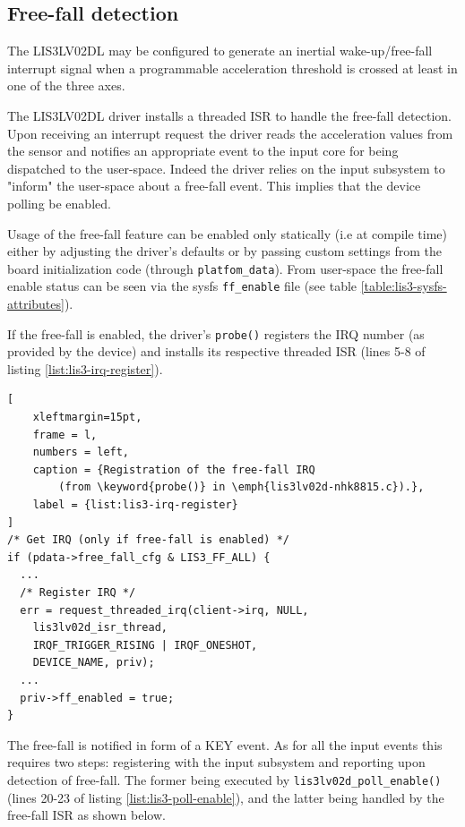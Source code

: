 \documentclass[a4paper,10pt]{article}
\newcommand{\keyword}[1]{\texttt{#1}}
\begin{document}
\begin{multicols}{2}
\subsection{Free-fall detection}
\label{sec:lis3_free-fall}
The LIS3LV02DL may be configured to generate an inertial wake-up/free-fall
interrupt signal when a programmable acceleration threshold is crossed at least
in one of the three axes.

The LIS3LV02DL driver installs a threaded ISR to handle the free-fall detection.
Upon receiving an interrupt request the driver reads the acceleration values
from the sensor and notifies an appropriate event to the input core for being
dispatched to the user-space.
Indeed the driver relies on the input subsystem to "inform" the user-space
about a free-fall event. This implies that the device polling be enabled.

Usage of the free-fall feature can be enabled only statically (i.e at compile
time) either by adjusting the driver's defaults or by passing custom settings
from the board initialization code (through \keyword{platfom\_data}).
From user-space the free-fall enable status can be seen via the sysfs
\keyword{ff\_enable} file (see table \ref{table:lis3-sysfs-attributes}).

If the free-fall is enabled, the driver's \keyword{probe()} registers the IRQ
number (as provided by the device) and installs its respective threaded ISR
(lines 5-8 of listing \ref{list:lis3-irq-register}).

\begin{lstlisting}[
	xleftmargin=15pt,
	frame = l,
	numbers = left,
	caption = {Registration of the free-fall IRQ
		(from \keyword{probe()} in \emph{lis3lv02d-nhk8815.c}).},
	label = {list:lis3-irq-register}
]
/* Get IRQ (only if free-fall is enabled) */
if (pdata->free_fall_cfg & LIS3_FF_ALL) {
  ...
  /* Register IRQ */
  err = request_threaded_irq(client->irq, NULL,
    lis3lv02d_isr_thread,
    IRQF_TRIGGER_RISING | IRQF_ONESHOT,
    DEVICE_NAME, priv);
  ...
  priv->ff_enabled = true;
}
\end{lstlisting}

The free-fall is notified in form of a KEY event. As for all the input
events this requires two steps: registering with the input subsystem
and reporting upon detection of free-fall.
The former being executed by \keyword{lis3lv02d\_poll\_enable()} (lines 20-23
of listing \ref{list:lis3-poll-enable}), and the latter being handled by the
free-fall ISR as shown below.


\end{multicols}
\end{document}
